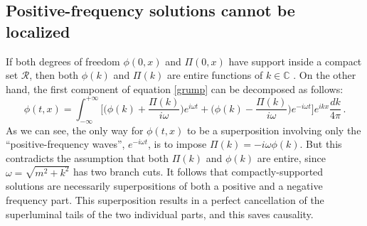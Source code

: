 \documentclass[prl, amsfonts, amssymb, amsmath, nofootinbib,reprint, showkeys, twoside,notitlepage]{revtex4-2}
\theoremstyle{definition}
\theoremstyle{theorem}
\theoremstyle{corollary}
\begin{document}
\subsection{Positive-frequency solutions cannot be localized}

If both degrees of freedom $\phi(0,x)$ and $\Pi(0,x)$ have support inside a compact set $\mathcal{R}$, then both $\phi(k)$ and $\Pi(k)$ are entire functions of $k \in \mathbb{C}$ \cite{Hormander_book}. On the other hand, the first component of equation \eqref{grump} can be decomposed as follows:
\begin{equation}
    \phi(t,x) = \int_{-\infty}^{+\infty}
\bigg[\bigg(\phi(k) + \dfrac{\Pi(k)}{i\omega} \bigg)e^{i\omega t}+\bigg(\phi(k) - \dfrac{\Pi(k)}{i\omega} \bigg)e^{-i\omega t} \bigg] e^{ikx} \dfrac{dk}{4\pi} \, .
\end{equation}
As we can see, the only way for $\phi(t,x)$ to be a superposition involving only the ``positive-frequency waves'', $e^{-i\omega t}$, is to impose $\Pi(k)=-i\omega \phi(k)$. But this contradicts the assumption that both $\Pi(k)$ and $\phi(k)$ are entire, since $\omega = \sqrt{m^2+k^2}$ has two branch cuts. It follows that compactly-supported solutions are necessarily superpositions of both a positive and a negative frequency part. This superposition results in a perfect cancellation of the superluminal tails of the two individual parts, and this saves causality.


\newpage


%



\label{lastpage}
\end{document}
